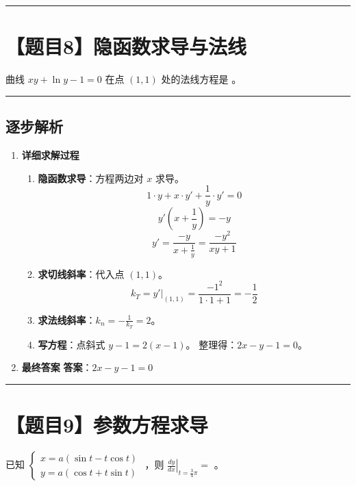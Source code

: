 \documentclass[UTF8]{ctexart}
\newenvironment{redenv}{\color{red}}{}
\newenvironment{detailedanalysis}{%
    \color{red}
    \begin{enumerate}[label=\textbf{第\arabic*步：}, leftmargin=*, align=left, itemsep=1.5ex]
}{%
    \end{enumerate}
}
\newcommand{\problemrule}{\noindent\rule{\textwidth}{1.5pt}\vspace{-0.8em}}
\newcommand{\analysisrule}{\noindent\rule{\textwidth}{0.8pt}\vspace{-0.8em}}
\newcommand{\blank}[1]{\underline{\hspace{#1}}}
\begin{document}
\problemrule
\section*{【题目8】隐函数求导与法线}
曲线 $ xy + \ln y - 1 = 0 $ 在点 $(1,1)$ 处的法线方程是 \blank{2cm}。

\begin{redenv}
\analysisrule
\subsection*{逐步解析}

\begin{detailedanalysis}
\item \textbf{详细求解过程}
\begin{enumerate}[label=(\arabic*)]
\item \textbf{隐函数求导}：方程两边对 $x$ 求导。
$$ 1 \cdot y + x \cdot y' + \frac{1}{y} \cdot y' = 0 $$
$$ y' (x + \frac{1}{y}) = -y $$
$$ y' = \frac{-y}{x + \frac{1}{y}} = \frac{-y^2}{xy + 1} $$
\item \textbf{求切线斜率}：代入点 $(1,1)$。
$$ k_{T} = y'|_{(1,1)} = \frac{-1^2}{1\cdot 1 + 1} = -\frac{1}{2} $$
\item \textbf{求法线斜率}：$k_n = -\frac{1}{k_T} = 2$。
\item \textbf{写方程}：点斜式 $y - 1 = 2(x - 1)$。
整理得：$2x - y - 1 = 0$。
\end{enumerate}

\item \textbf{最终答案}
\textbf{答案}：$ 2x - y - 1 = 0 $
\end{detailedanalysis}
\end{redenv}

\problemrule
\section*{【题目9】参数方程求导}
已知 $ \begin{cases} x = a(\sin t - t\cos t) \\ y = a(\cos t + t\sin t) \end{cases} $ ，则 $ \left.\frac{dy}{dx}\right|_{t=\frac{3}{4}\pi} = $ \blank{2cm}。
\end{document}
